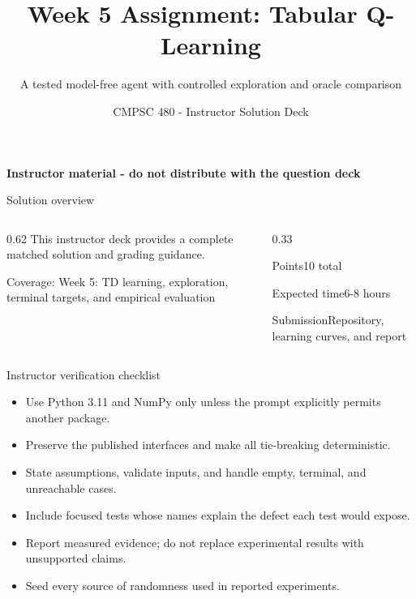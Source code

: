 \documentclass[aspectratio=169,11pt]{beamer}
\title[Week 5 Assignment Solutions]{Week 5 Assignment: Tabular Q-Learning}
\subtitle{A tested model-free agent with controlled exploration and oracle comparison}
\author{CMPSC 480 - Instructor Solution Deck}
\date{}
\begin{document}
\begin{frame}
  \titlepage
\vspace{-0.35cm}
\begin{center}
\color{coursered}\bfseries Instructor material - do not distribute with the question deck
\end{center}
\end{frame}

\begin{frame}{Solution overview}
\begin{columns}[T,onlytextwidth]
\begin{column}{0.62\textwidth}
\Large This instructor deck provides a complete matched solution and grading guidance.

\vspace{0.35cm}
\normalsize
Coverage: Week 5: TD learning, exploration, terminal targets, and empirical evaluation
\end{column}
\begin{column}{0.33\textwidth}
\begin{block}{Points}10 total\end{block}
\begin{block}{Expected time}6-8 hours\end{block}
\begin{block}{Submission}Repository, learning curves, and report\end{block}
\end{column}
\end{columns}
\end{frame}

\begin{frame}{Instructor verification checklist}
\small
\begin{itemize}
  \item Use Python 3.11 and NumPy only unless the prompt explicitly permits another package.
  \item Preserve the published interfaces and make all tie-breaking deterministic.
  \item State assumptions, validate inputs, and handle empty, terminal, and unreachable cases.
  \item Include focused tests whose names explain the defect each test would expose.
  \item Report measured evidence; do not replace experimental results with unsupported claims.
  \item Seed every source of randomness used in reported experiments.
\end{itemize}
\end{frame}
\end{document}
